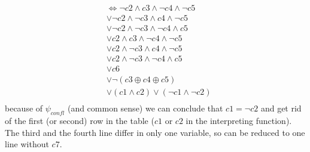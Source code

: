 \documentclass{scrartcl}
\begin{document}
\begin{itemize}
\begin{align*}
	&\Leftrightarrow ¬c2 \land c3 \land ¬c4 \land ¬c5\\
	&\lor ¬c2 \land ¬c3 \land c4 \land ¬c5 \\
	&\lor ¬c2 \land ¬c3 \land ¬c4 \land c5 \\
	&\lor c2 \land c3 \land ¬c4 \land ¬c5 \\
	&\lor c2 \land ¬c3 \land c4 \land ¬c5 \\
	&\lor c2 \land ¬c3 \land ¬c4 \land c5 \\
	&\lor c6\\
	&\lor ¬(c3 \oplus c4 \oplus c5)\\
	&\lor (c1 \land c2 )\lor(¬c1 \land ¬c2)\\
    \end{align*}
    because of $\psi_{confl}$ (and common sense) we can conclude that $c1 = ¬c2$ and get rid of the first (or second) row in the table ($c1$ or $c2$ in the interpreting function). The third and the fourth line differ in only one variable, so can be reduced to one line without $c7$.
\end{itemize}
\end{document}
